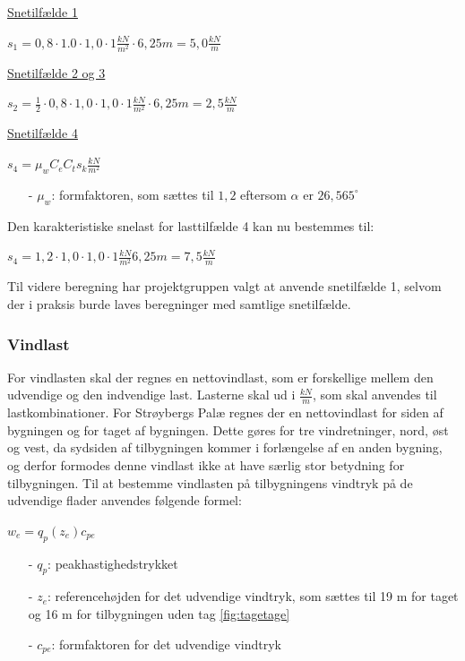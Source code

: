 \underline{Snetilfælde 1}
\begin{center}
$s_1=0,\!8\cdot 1.0\cdot 1,\!0\cdot 1 \frac{kN}{m^2}\cdot 6,\!25 m=5,\!0 \frac{kN}{m}$
\end{center}
\underline{Snetilfælde 2 og 3}
\begin{center}
$s_2=\frac{1}{2}\cdot 0,\!8\cdot 1,\!0\cdot 1,\!0\cdot 1 \frac{kN}{m^2}\cdot 6,\!25 m=2,\!5 \frac{kN}{m}$
\end{center}
\underline{Snetilfælde 4}
\begin{center}
	$s_4=\mu_wC_eC_ts_k \frac{kN}{m^2}$
\end{center}
\begin{itemize}
	\item[-] $\mu_w$: formfaktoren, som sættes til $1,\!2$ eftersom $\alpha$ er $26,\!565^{\circ}$ \citep[ kapitel 5.3.3]{EU91}
\end{itemize}
Den karakteristiske snelast for lasttilfælde 4 kan nu bestemmes til:
\begin{center}
	$s_4=1,\!2\cdot 1,\!0\cdot 1,\!0\cdot 1 \frac{kN}{m^2}6,\!25 m=7,\!5 \frac{kN}{m}$
\end{center}
Til videre beregning har projektgruppen valgt at anvende snetilfælde 1, selvom der i praksis burde laves beregninger med samtlige snetilfælde.

\subsubsection{Vindlast}
For vindlasten skal der regnes en nettovindlast, som er forskellige mellem den udvendige og den indvendige last. Lasterne skal ud i $\frac{kN}{m}$, som skal anvendes til lastkombinationer.
\newline \indent{     }  For Strøybergs Palæ regnes der en nettovindlast for siden af bygningen og for taget af bygningen. Dette gøres for tre vindretninger, nord, øst og vest, da sydsiden af tilbygningen kommer i forlængelse af en anden bygning, og derfor formodes denne vindlast ikke at have særlig stor betydning for tilbygningen.
\newline
\newline
Til at bestemme vindlasten på tilbygningens vindtryk på de udvendige flader anvendes følgende formel:	
\begin{center} 
	$w_e=q_p(z_e)c_{pe}$
\end{center}
\begin{itemize}
	\item[-] $q_p$: peakhastighedstrykket
	\item[-] $z_e$: referencehøjden for det udvendige vindtryk, som sættes til 19 m for taget og 16 m for tilbygningen uden tag \ref{fig:tagetage}
	\item[-] $c_{pe}$: formfaktoren for det udvendige vindtryk
\end{itemize}

